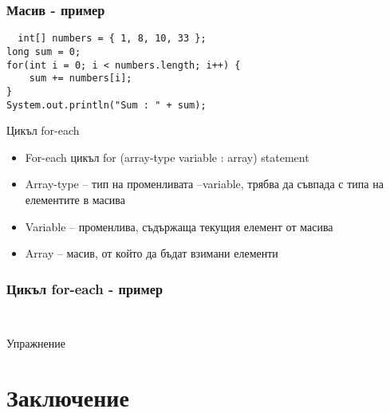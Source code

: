 \documentclass{beamer}
\begin{document}
\begin{frame}[fragile]
  \frametitle{Масив - пример}
\begin{lstlisting}
  int[] numbers = { 1, 8, 10, 33 };
long sum = 0;
for(int i = 0; i < numbers.length; i++) {
    sum += numbers[i];
}
System.out.println("Sum : " + sum);
\end{lstlisting}
\end{frame}

\begin{frame}{Цикъл for-each}
  \begin{itemize}
  \item             For-each цикъл
    for (array-type variable : array) statement

    \item Array-type – тип на променливата
    –variable, трябва да съвпада с типа на
    елементите в масива
    \item Variable – променлива, съдържаща
    текущия елемент от масива
    \item Array – масив, от който да бъдат
    взимани елементи

  \end{itemize}
\end{frame}

\begin{frame}[fragile]
  \frametitle{Цикъл for-each - пример}
\begin{lstlisting}
  
\end{lstlisting}
\end{frame}


\begin{frame}{Упражнение}
  
\end{frame}


\section*{Заключение}
\end{document}
